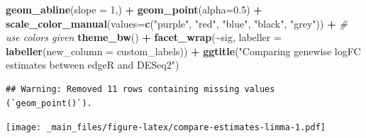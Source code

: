 \documentclass[
]{book}
\newenvironment{Shaded}{\begin{snugshade}}{\end{snugshade}}
\newcommand{\AttributeTok}[1]{\textcolor[rgb]{0.13,0.29,0.53}{#1}}
\newcommand{\CommentTok}[1]{\textcolor[rgb]{0.56,0.35,0.01}{\textit{#1}}}
\newcommand{\DecValTok}[1]{\textcolor[rgb]{0.00,0.00,0.81}{#1}}
\newcommand{\FloatTok}[1]{\textcolor[rgb]{0.00,0.00,0.81}{#1}}
\newcommand{\FunctionTok}[1]{\textcolor[rgb]{0.13,0.29,0.53}{\textbf{#1}}}
\newcommand{\NormalTok}[1]{#1}
\newcommand{\SpecialCharTok}[1]{\textcolor[rgb]{0.81,0.36,0.00}{\textbf{#1}}}
\newcommand{\StringTok}[1]{\textcolor[rgb]{0.31,0.60,0.02}{#1}}
\begin{document}
\begin{Shaded}
\begin{Highlighting}[]
  \FunctionTok{geom\_abline}\NormalTok{(}\AttributeTok{slope =} \DecValTok{1}\NormalTok{,) }\SpecialCharTok{+}
  \FunctionTok{geom\_point}\NormalTok{(}\AttributeTok{alpha=}\FloatTok{0.5}\NormalTok{) }\SpecialCharTok{+}
  \FunctionTok{scale\_color\_manual}\NormalTok{(}\AttributeTok{values=}\FunctionTok{c}\NormalTok{(}\StringTok{"purple"}\NormalTok{, }\StringTok{"red"}\NormalTok{, }\StringTok{"blue"}\NormalTok{, }\StringTok{"black"}\NormalTok{, }\StringTok{"grey"}\NormalTok{)) }\SpecialCharTok{+} \CommentTok{\# use colors given}
  \FunctionTok{theme\_bw}\NormalTok{() }\SpecialCharTok{+}
  \FunctionTok{facet\_wrap}\NormalTok{(}\SpecialCharTok{\textasciitilde{}}\NormalTok{sig, }\AttributeTok{labeller =} \FunctionTok{labeller}\NormalTok{(}\AttributeTok{new\_column =}\NormalTok{ custom\_labels)) }\SpecialCharTok{+}
  \FunctionTok{ggtitle}\NormalTok{(}\StringTok{"Comparing genewise logFC estimates between edgeR and DESeq2"}\NormalTok{)}
\end{Highlighting}
\end{Shaded}

\begin{verbatim}
## Warning: Removed 11 rows containing missing values (`geom_point()`).
\end{verbatim}

\texttt{[image: \_main\_files/figure-latex/compare-estimates-limma-1.pdf]}
\end{document}
